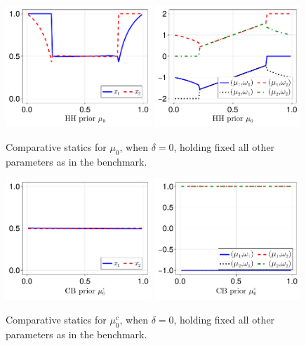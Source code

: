\documentclass[12pt,a4paper]{article}
\begin{document}
\begin{figure}[H]
\centering
\includegraphics[width=0.49\textwidth]{figures/V8/γ_1/fig_optimal_π_across_μ_0_ω_1_1_ω_2_-1_δ_0.0_.pdf}
\includegraphics[width=0.49\textwidth]{figures/V8/γ_1/fig_posterior_across_μ_0_ω_1_1_ω_2_-1_δ_0.0_.pdf}
\caption{Comparative statics for $\mu_0$, when $\delta=0$, holding fixed all other parameters as in the benchmark.}
\label{FigureA21}
\end{figure}

\begin{figure}[H]
\centering
\includegraphics[width=0.49\textwidth]{figures/V8/γ_1/fig_optimal_π_across_μ_0_c_ω_1_1_ω_2_-1_δ_0.0_.pdf}
\includegraphics[width=0.49\textwidth]{figures/V8/γ_1/fig_posterior_across_μ_0_c_ω_1_1_ω_2_-1_δ_0.0_.pdf}
\caption{Comparative statics for $\mu_0^c$, when $\delta=0$, holding fixed all other parameters as in the benchmark.}
\label{FigureA22}
\end{figure}
\end{document}
